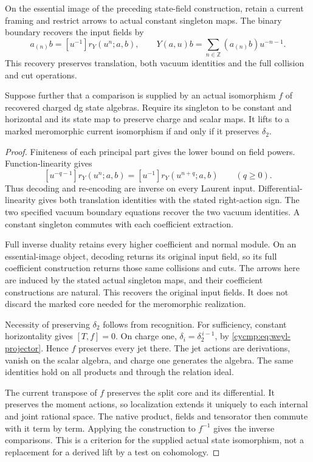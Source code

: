 \begin{proposition}\label{cycmp:prop:framed-reconstruction}
On the essential image of the preceding state-field construction,
retain a current framing and restrict arrows to actual constant
singleton maps. The binary boundary recovers the input fields by
\begin{equation}\label{cycmp:eq:decode}
 a_{(n)}b=[u^{-1}]r_Y(u^n;a,b),\qquad
 Y(a,u)b=\sum_{n\in\mathbb Z}(a_{(n)}b)u^{-n-1}.
\end{equation}
This recovery preserves translation, both vacuum identities and
the full collision and cut operations.

Suppose further that a comparison is supplied by an actual
isomorphism $f$ of recovered charged dg state algebras.
Require its singleton to be constant and horizontal and its state
map to preserve charge and scalar maps. It lifts
to a marked meromorphic current isomorphism if and only if it
preserves $\delta_2$.
\end{proposition}

\begin{proof}
Finiteness of each principal part gives the lower bound on field
powers. Function-linearity gives
\[
 [u^{-q-1}]r_Y(u^n;a,b)
       =[u^{-1}]r_Y(u^{n+q};a,b)\qquad(q\ge0).
\]
Thus decoding and re-encoding are inverse on every Laurent input.
Differential-linearity gives both translation identities with the
stated right-action sign. The two specified vacuum boundary
equations recover the two vacuum identities. A constant singleton
commutes with each coefficient extraction.

Full inverse duality retains every higher coefficient and normal
module. On an essential-image object, decoding returns its original
input field, so its full coefficient construction returns those
same collisions and cuts. The arrows here are induced by the stated
actual singleton maps, and their coefficient constructions are
natural. This recovers the original input fields. It does not
discard the marked core needed for the meromorphic realization.

Necessity of preserving $\delta_2$ follows from recognition.
For sufficiency, constant horizontality gives $[T,f]=0$.
On charge one, $\delta_i=\delta_2^{\,i-1}$, by
\eqref{cycmp:eq:weyl-projector}. Hence $f$ preserves every jet
there. The jet actions are derivations, vanish on the scalar
algebra, and charge one generates the algebra. The same identities
hold on all products and through the relation ideal.

The current transpose of $f$ preserves the split core and its
differential. It preserves the moment actions, so localization
extends it uniquely to each internal and joint rational space.
The native product, fields and tensorator then commute with it
term by term. Applying the construction to $f^{-1}$ gives the
inverse comparisons. This is a criterion for the supplied actual
state isomorphism, not a replacement for a derived lift by a test
on cohomology.
\end{proof}

